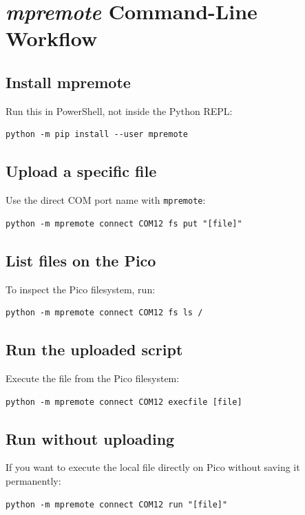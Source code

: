 \documentclass[11pt,a4paper]{article}
\begin{document}
\section{\textit{mpremote} Command-Line Workflow}
\subsection{Install mpremote}
Run this in PowerShell, not inside the Python REPL:
\begin{verbatim}
python -m pip install --user mpremote
\end{verbatim}

\subsection{Upload a specific file}
Use the direct COM port name with \texttt{mpremote}:
\begin{verbatim}
python -m mpremote connect COM12 fs put "[file]"
\end{verbatim}

\subsection{List files on the Pico}
To inspect the Pico filesystem, run:
\begin{verbatim}
python -m mpremote connect COM12 fs ls /
\end{verbatim}

\subsection{Run the uploaded script}
Execute the file from the Pico filesystem:
\begin{verbatim}
python -m mpremote connect COM12 execfile [file]
\end{verbatim}

\subsection{Run without uploading}
If you want to execute the local file directly on Pico without saving it permanently:
\begin{verbatim}
python -m mpremote connect COM12 run "[file]"
\end{verbatim}
\end{document}
